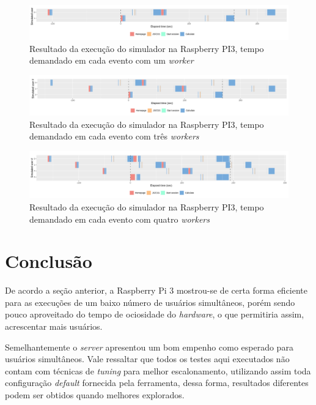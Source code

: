 \documentclass[12pt,english,brazil]{article}
\begin{document}
\begin{figure}[htbp]
  \centering 
  \includegraphics[scale=.4]{paperWSCAD2021/figures/user_PI3_2_worker.png}
  \caption{Resultado da execução do simulador na Raspberry PI3, tempo demandado em cada evento com um \emph{worker}}
  \label{PI3_2wroker}
\end{figure}

\begin{figure}[htbp]
  \centering 
  \includegraphics[scale=.4]{paperWSCAD2021/figures/user_PI3_3_worker.png}
  \caption{Resultado da execução do simulador na Raspberry PI3, tempo demandado em cada evento com três \emph{workers}}
  \label{PI3_3wroker}
\end{figure}

\begin{figure}[htbp]
  \centering 
  \includegraphics[scale=.4]{paperWSCAD2021/figures/user_PI3_4_worker.png}
  \caption{Resultado da execução do simulador na Raspberry PI3, tempo demandado em cada evento com quatro \emph{workers}}
  \label{PI3_4wroker}
\end{figure}

\section{Conclusão} \label{sec:conlusao}
De acordo a seção anterior, a Raspberry Pi 3 mostrou-se de certa forma eficiente para as execuções de um baixo número de usuários simultâneos, porém sendo pouco aproveitado do tempo de ociosidade do \emph{hardware}, o que permitiria assim, acrescentar mais usuários. 

Semelhantemente o \emph{server} apresentou um bom empenho como esperado para usuários simultâneos. Vale ressaltar que todos os testes aqui executados não contam com técnicas de \emph{tuning} para melhor escalonamento, utilizando assim toda configuração \emph{default} fornecida pela ferramenta, dessa forma, resultados diferentes podem ser obtidos quando melhores explorados.
\end{document}
